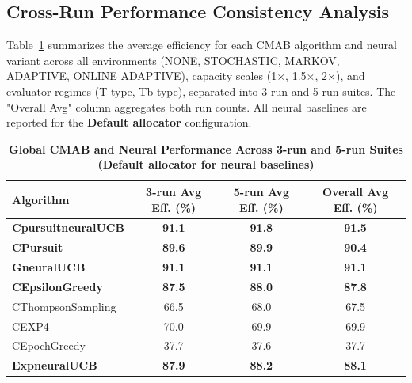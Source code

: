 \documentclass[12pt,a4paper]{article}
\newcommand{\performance}[1]{\textcolor{performancecolor}{\textbf{#1}}}
\newcommand{\neural}[1]{\textcolor{neuralcolor}{\textbf{#1}}}
\begin{document}
\begin{tcolorbox}[colback=performancecolor!10,colframe=performancecolor,title=\textbf{Primary Performance Results (Aggregated Across Capacities, Environments, and Regimes)}]

\subsection{Cross-Run Performance Consistency Analysis}

Table~\ref{tab:global-performance} summarizes the average efficiency for each CMAB algorithm and neural variant across all environments (NONE, STOCHASTIC, MARKOV, ADAPTIVE, ONLINE ADAPTIVE), capacity scales (1$\times$, 1.5$\times$, 2$\times$), and evaluator regimes (T-type, Tb-type), separated into 3-run and 5-run suites. The "Overall Avg" column aggregates both run counts. All neural baselines are reported for the \textbf{Default allocator} configuration.

\begin{table}[H]
\small
\centering
\caption{\performance{Global CMAB and Neural Performance Across 3-run and 5-run Suites (Default allocator for neural baselines)}}
\label{tab:global-performance}
\begin{tabular}{|l|c|c|c|}
\hline
\textbf{Algorithm} & \textbf{3-run Avg Eff. (\%)} & \textbf{5-run Avg Eff. (\%)} & \textbf{Overall Avg Eff. (\%)} \\
\hline
\hline
\neural{CpursuitneuralUCB} & \neural{91.1} & \neural{91.8} & \neural{\textbf{91.5}} \\
\performance{CPursuit}                 & \performance{89.6} & \performance{89.9} & \performance{\textbf{90.4}} \\
\neural{GneuralUCB}        & \neural{91.1} & \neural{91.1} & \neural{\textbf{91.1}} \\
\performance{CEpsilonGreedy}          & \performance{87.5} & \performance{88.0} & \performance{\textbf{87.8}} \\
CThompsonSampling                     & 66.5              & 68.0              & 67.5 \\
CEXP4                                 & 70.0              & 69.9              & 69.9 \\
CEpochGreedy                          & 37.7              & 37.6              & 37.7 \\
\neural{ExpneuralUCB}      & \neural{87.9} & \neural{88.2} & \neural{\textbf{88.1}} \\
\hline
\end{tabular}
\end{table}


\end{tcolorbox}
\end{document}
